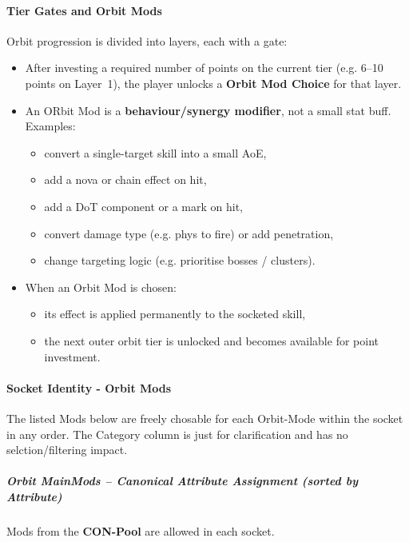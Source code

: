 \paragraph{Tier Gates and Orbit Mods}

Orbit progression is divided into layers, each with a gate:

\begin{itemize}
	\item After investing a required number of points on the current tier (e.g. 6--10 points on Layer~1),
	the player unlocks a \textbf{Orbit Mod Choice} for that layer.
	\item An ORbit Mod is a \textbf{behaviour/synergy modifier}, not a small stat buff. Examples:
	\begin{itemize}
		\item convert a single-target skill into a small AoE,
		\item add a nova or chain effect on hit,
		\item add a DoT component or a mark on hit,
		\item convert damage type (e.g. phys to fire) or add penetration,
		\item change targeting logic (e.g. prioritise bosses / clusters).
	\end{itemize}
	\item When an Orbit Mod is chosen:
	\begin{itemize}
		\item its effect is applied permanently to the socketed skill,
		\item the next outer orbit tier is unlocked and becomes available for point investment.
	\end{itemize}
\end{itemize}

\paragraph{Socket Identity - Orbit Mods}

The listed Mods below are freely chosable for each Orbit-Mode within the socket in any order.
The Category column is just for clarification and has no selction/filtering impact.

\subparagraph{Orbit MainMods -- Canonical Attribute Assignment (sorted by Attribute)}
Mods from the \textbf{CON-Pool} are allowed in each socket.\\


